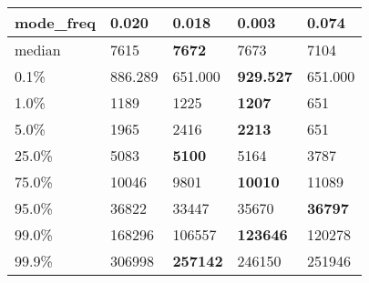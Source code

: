 \begin{table}[H]
\begin{tabular}{|l|m{10em}|m{10em}|m{10em}|m{10em}|}
\hline mode\_freq & 0.020 & \bfseries 0.018 & 0.003 & \cellcolor[rgb]{0.9, 0.54, 0.52} 0.074 \\
\hline median & 7615 & \bfseries 7672 & 7673 & \cellcolor[rgb]{0.9, 0.54, 0.52} 7104 \\
\hline 0.1\% & 886.289 & \cellcolor[rgb]{0.9, 0.54, 0.52} 651.000 & \bfseries 929.527 & \cellcolor[rgb]{0.9, 0.54, 0.52} 651.000 \\
\hline 1.0\% & 1189 & 1225 & \bfseries 1207 & \cellcolor[rgb]{0.9, 0.54, 0.52} 651 \\
\hline 5.0\% & 1965 & 2416 & \bfseries 2213 & \cellcolor[rgb]{0.9, 0.54, 0.52} 651 \\
\hline 25.0\% & 5083 & \bfseries 5100 & 5164 & \cellcolor[rgb]{0.9, 0.54, 0.52} 3787 \\
\hline 75.0\% & 10046 & 9801 & \bfseries 10010 & \cellcolor[rgb]{0.9, 0.54, 0.52} 11089 \\
\hline 95.0\% & 36822 & \cellcolor[rgb]{0.9, 0.54, 0.52} 33447 & 35670 & \bfseries 36797 \\
\hline 99.0\% & 168296 & \cellcolor[rgb]{0.9, 0.54, 0.52} 106557 & \bfseries 123646 & 120278 \\
\hline 99.9\% & 306998 & \bfseries 257142 & \cellcolor[rgb]{0.9, 0.54, 0.52} 246150 & 251946 \\
\hline
\end{tabular}
\end{table}
